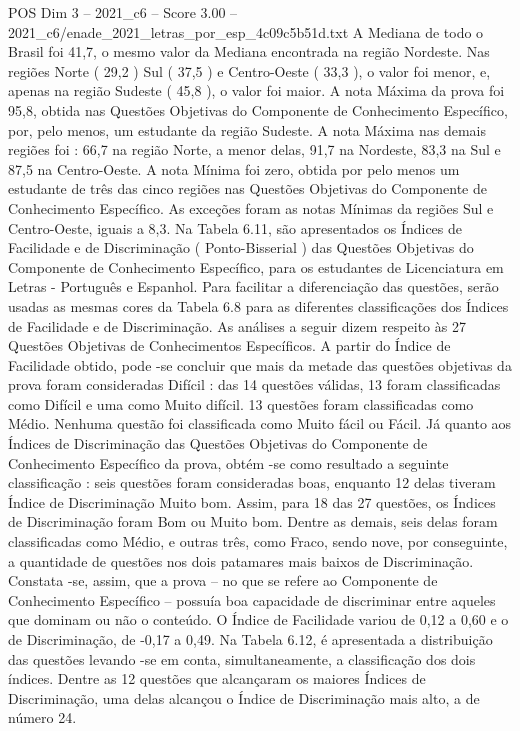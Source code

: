 \begin{textsample}{POS Dim 3 – 2021\_c6 – Score 3.00 – 2021\_c6/enade\_2021\_letras\_por\_esp\_4c09c5b51d.txt}
A Mediana de todo o Brasil foi 41,7, o mesmo valor da Mediana encontrada na região Nordeste.
Nas regiões Norte ( 29,2 ) Sul ( 37,5 ) e Centro-Oeste ( 33,3 ), o valor foi menor, e, apenas na região Sudeste ( 45,8 ), o valor foi maior.
A nota Máxima da prova foi 95,8, obtida nas Questões Objetivas do Componente de Conhecimento Específico, por, pelo menos, um estudante da região Sudeste.
A nota Máxima nas demais regiões foi : 66,7 na região Norte, a menor delas, 91,7 na Nordeste, 83,3 na Sul e 87,5 na Centro-Oeste.
A nota Mínima foi zero, obtida por pelo menos um estudante de três das cinco regiões nas Questões Objetivas do Componente de Conhecimento Específico.
As exceções foram as notas Mínimas da regiões Sul e Centro-Oeste, iguais a 8,3.
Na Tabela 6.11, são apresentados os Índices de Facilidade e de Discriminação ( Ponto-Bisserial ) das Questões Objetivas do Componente de Conhecimento Específico, para os estudantes de Licenciatura em Letras - Português e Espanhol.
Para facilitar a diferenciação das questões, serão usadas as mesmas cores da Tabela 6.8 para as diferentes classificações dos Índices de Facilidade e de Discriminação.
As análises a seguir dizem respeito às 27 Questões Objetivas de Conhecimentos Específicos.
A partir do Índice de Facilidade obtido, pode -se concluir que mais da metade das questões objetivas da prova foram consideradas Difícil : das 14 questões válidas, 13 foram classificadas como Difícil e uma como Muito difícil. 13 questões foram classificadas como Médio.
Nenhuma questão foi classificada como Muito fácil ou Fácil.
Já quanto aos Índices de Discriminação das Questões Objetivas do Componente de Conhecimento Específico da prova, obtém -se como resultado a seguinte classificação : seis questões foram consideradas boas, enquanto 12 delas tiveram Índice de Discriminação Muito bom.
Assim, para 18 das 27 questões, os Índices de Discriminação foram Bom ou Muito bom.
Dentre as demais, seis delas foram classificadas como Médio, e outras três, como Fraco, sendo nove, por conseguinte, a quantidade de questões nos dois patamares mais baixos de Discriminação.
Constata -se, assim, que a prova – no que se refere ao Componente de Conhecimento Específico – possuía boa capacidade de discriminar entre aqueles que dominam ou não o conteúdo.
O Índice de Facilidade variou de 0,12 a 0,60 e o de Discriminação, de -0,17 a 0,49.
Na Tabela 6.12, é apresentada a distribuição das questões levando -se em conta, simultaneamente, a classificação dos dois índices.
Dentre as 12 questões que alcançaram os maiores Índices de Discriminação, uma delas alcançou o Índice de Discriminação mais alto, a de número 24.

\end{textsample}
